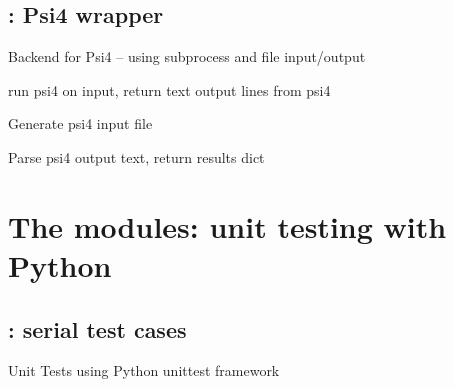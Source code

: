 \documentclass[letterpaper,10pt,english]{sphinxmanual}
\begin{document}
\subsection{: Psi4 wrapper}
\label{\detokenize{backend:module-backend.psi4}}\label{\detokenize{backend:psi4-psi4-wrapper}}
Backend for Psi4 -- using subprocess and file input/output

\begin{fulllineitems}
\label{\detokenize{backend:backend.psi4.calculate}}
run psi4 on input, return text output lines from psi4

\end{fulllineitems}


\begin{fulllineitems}
\label{\detokenize{backend:backend.psi4.inp}}
Generate psi4 input file

\end{fulllineitems}


\begin{fulllineitems}
\label{\detokenize{backend:backend.psi4.parse}}
Parse psi4 output text, return results dict

\end{fulllineitems}



\section{The  modules: unit testing with Python}
\label{\detokenize{test:the-test-modules-unit-testing-with-python}}\label{\detokenize{test::doc}}

\subsection{: serial test cases}
\label{\detokenize{test:test-serial-test-cases}}\label{\detokenize{test:module-test.test}}
Unit Tests using Python unittest framework
\end{document}
